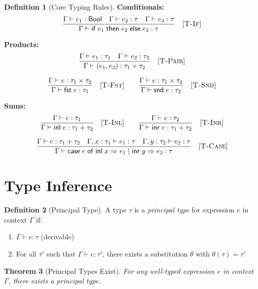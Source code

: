 \documentclass[11pt,twoside,openright]{book}
\theoremstyle{definition}
\newtheorem{definition}{Definition}[chapter]
\theoremstyle{plain}
\newtheorem{theorem}[definition]{Theorem}
\theoremstyle{remark}
\begin{document}
\begin{definition}[Core Typing Rules]
\textbf{Conditionals:}
\[
\frac{\Gamma \vdash e_1 : \mathsf{Bool} \quad \Gamma \vdash e_2 : \tau \quad \Gamma \vdash e_3 : \tau}{\Gamma \vdash \mathsf{if}\; e_1 \;\mathsf{then}\; e_2 \;\mathsf{else}\; e_3 : \tau} \quad [\textsc{T-If}]
\]

\textbf{Products:}
\[
\frac{\Gamma \vdash e_1 : \tau_1 \quad \Gamma \vdash e_2 : \tau_2}{\Gamma \vdash (e_1, e_2) : \tau_1 \times \tau_2} \quad [\textsc{T-Pair}]
\]

\[
\frac{\Gamma \vdash e : \tau_1 \times \tau_2}{\Gamma \vdash \mathsf{fst}\; e : \tau_1} \quad [\textsc{T-Fst}]
\qquad
\frac{\Gamma \vdash e : \tau_1 \times \tau_2}{\Gamma \vdash \mathsf{snd}\; e : \tau_2} \quad [\textsc{T-Snd}]
\]

\textbf{Sums:}
\[
\frac{\Gamma \vdash e : \tau_1}{\Gamma \vdash \mathsf{inl}\; e : \tau_1 + \tau_2} \quad [\textsc{T-Inl}]
\qquad
\frac{\Gamma \vdash e : \tau_2}{\Gamma \vdash \mathsf{inr}\; e : \tau_1 + \tau_2} \quad [\textsc{T-Inr}]
\]

\[
\frac{\Gamma \vdash e : \tau_1 + \tau_2 \quad \Gamma, x : \tau_1 \vdash e_1 : \tau \quad \Gamma, y : \tau_2 \vdash e_2 : \tau}{\Gamma \vdash \mathsf{case}\; e \;\mathsf{of}\; \mathsf{inl}\; x \Rightarrow e_1 \mid \mathsf{inr}\; y \Rightarrow e_2 : \tau} \quad [\textsc{T-Case}]
\]
\end{definition}

\section{Type Inference}

\begin{definition}[Principal Type]
\label{def:principal-type}
A type $\tau$ is a \emph{principal type} for expression $e$ in context $\Gamma$ if:
\begin{enumerate}
\item $\Gamma \vdash e : \tau$ (derivable)
\item For all $\tau'$ such that $\Gamma \vdash e : \tau'$, there exists a substitution $\theta$ with $\theta(\tau) = \tau'$
\end{enumerate}
\end{definition}

\begin{theorem}[Principal Types Exist]
\label{thm:principal-types}
For any well-typed expression $e$ in context $\Gamma$, there exists a principal type.
\end{theorem}
\end{document}
